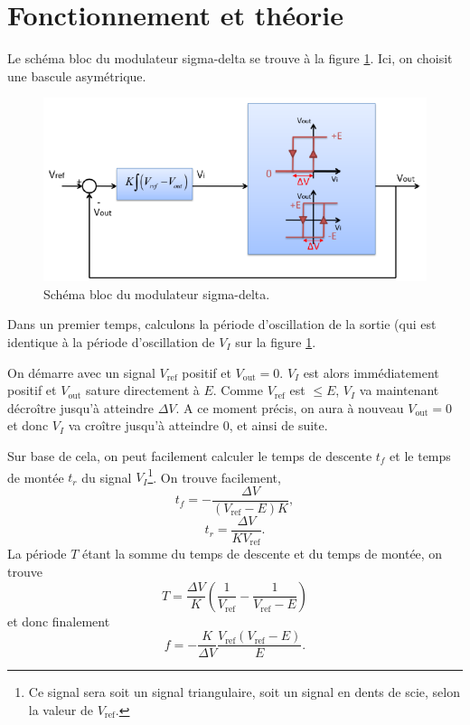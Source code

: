 

\section{Fonctionnement et théorie}
Le schéma bloc du modulateur sigma-delta se trouve
à la figure \ref{fig:sigma-delta-schema-blocs}. Ici,
on choisit une bascule asymétrique.

\begin{figure}[ht]
	\centering
	\includegraphics[scale=0.75]{img/schema-blocs.png}
	\caption{Schéma bloc du modulateur sigma-delta.}
	\label{fig:sigma-delta-schema-blocs}
\end{figure}

Dans un premier temps, calculons la période
d'oscillation de la sortie (qui est identique
à la période d'oscillation de $V_I$ sur la figure
\ref{fig:sigma-delta-schema-blocs}.

On démarre avec un signal $V_{\text{ref}}$ positif et
$V_{\text{out}} = 0$. $V_I$ est alors immédiatement positif
et $V_{\text{out}}$ sature directement à $E$. Comme $V_{\text{ref}}$
est $\leq E$, $V_I$ va maintenant décroître jusqu'à atteindre
$\Delta V$. A ce moment précis, on aura à nouveau $V_{\text{out}} = 0$
et donc $V_I$ va croître jusqu'à atteindre 0, et ainsi de suite.

Sur base de cela, on peut facilement calculer
le temps de descente $t_f$ et le temps de montée $t_r$
du signal $V_I$\footnote{Ce signal sera soit un signal triangulaire,
soit un signal en dents de scie, selon la valeur de $V_{\text{ref}}$.}.
On trouve facilement,
\[ t_f = -\frac{\Delta V}{(V_{\text{ref}} - E)K},\]
\[ t_r = \frac{\Delta V}{KV_{\text{ref}}}.\]
La période $T$ étant la somme du temps de descente et du temps
de montée, on trouve
\[ T = \frac{\Delta V}{K}\left(\frac{1}{V_{\text{ref}}} - \frac{1}{V_{\text{ref}} - E}\right)\]
et donc finalement
\[ f = -\frac{K}{\Delta V} \frac{V_{\text{ref}}(V_{\text{ref}}-E)}{E}.\]

